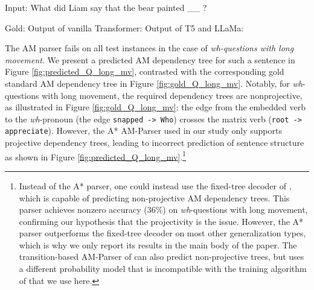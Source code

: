\begin{exe}
\ex \label{ex:q_long_mv_input}Input: What did Liam say that the bear painted \_\_ ?
\begin{xlist}
    \ex \label{ex:q_long_mv_gold} Gold:  
    \ex  \label{ex:q_long_mv_tm} Output of vanilla Transformer:  
    \ex \label{ex:q_long_mv_t5} Output of T5 and LLaMa:  
\end{xlist}
\end{exe}

The AM parser fails on all test instances in the case of \textit{wh-questions with long movement}. We present a predicted AM dependency tree for such a sentence in Figure \ref{fig:predicted_Q_long_mv}, contrasted with the corresponding gold standard AM dependency tree in Figure \ref{fig:gold_Q_long_mv}. Notably, for \textit{wh}-questions with long movement, the required dependency trees are nonprojective, as illustrated in Figure \ref{fig:gold_Q_long_mv}: the edge from the embedded verb to the \textit{wh}-pronoun (the edge \texttt{snapped -> Who}) crosses the matrix verb (\texttt{root -> appreciate}). However, the A* AM-Parser used in our study only supports projective dependency trees, leading to incorrect prediction of sentence structure as shown in Figure \ref{fig:predicted_Q_long_mv}.\footnote{Instead of the A* parser, one could instead use the fixed-tree decoder of \citet{groschwitz-etal-2018-amr}, which is capable of predicting non-projective
AM dependency trees. This parser achieves nonzero accuracy (36\%) on \textit{wh}-questions with long movement,
confirming our hypothesis that the projectivity is the issue. However, the A* parser
outperforms the fixed-tree decoder on most other generalization types, which is why
we only report its results in the main body of the paper. The transition-based
AM-Parser of \citet{lindemann-etal-2020-fast} can also predict non-projective trees,
but uses a different probability model that is incompatible with the training algorithm
of \citet{groschwitz-etal-2021-learning} that we use here.}

